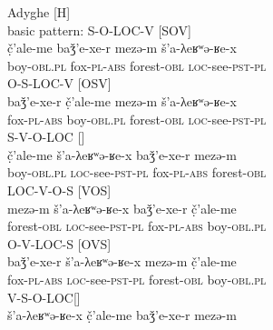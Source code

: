 \documentclass[output=paper,colorlinks,citecolor=brown, draft]{langscibook}
\begin{document}
\ea
\ea\label{Adyghe:ex:6}
Adyghe \citep[91]{jakovlev1941grammatika} [H] \\
basic pattern: \textcolor{C1}{S}-\textcolor{C2}{O}-\textcolor{C3}{LOC}-\textcolor{C4}{V} [SOV] \\
\gll \textcolor{C1}{č̣'ale-me} \textcolor{C2}{baǯ'e-xe-r} \textcolor{C3}{mezə-m} \textcolor{C4}{š'a-λeʁʷə-ʁe-x} \\ 
boy\textsc{-obl.pl} fox\textsc{-pl}\textsc{-abs} forest\textsc{-obl} \textsc{loc-}see\textsc{-pst}\textsc{-pl} \\
\ex\label{Adyghe:ex:7}
\textcolor{C2}{O}-\textcolor{C1}{S}-\textcolor{C3}{\textcolor{C3}{LOC}}-\textcolor{C4}{\textcolor{C4}{V}} [OSV] \\
\gll \textcolor{C2}{baǯ'e-xe-r} \textcolor{C1}{č̣'ale-me} \textcolor{C3}{mezə-m} \textcolor{C4}{š'a-λeʁʷə-ʁe-x} \\
fox\textsc{-pl-abs} boy\textsc{-obl.pl} forest\textsc{-obl} \textsc{loc-}see\textsc{-pst}\textsc{-pl} \\
\ex\label{Adyghe:ex:8}
\textcolor{C1}{S}-\textcolor{C4}{V}-\textcolor{C2}{O}-\textcolor{C3}{LOC} [] \\
\gll \textcolor{C1}{č̣'ale-me} \textcolor{C4}{š'a-λeʁʷə-ʁe-x} \textcolor{C2}{baǯ'e-xe-r} \textcolor{C3}{mezə-m} \\
boy\textsc{-obl.pl} \textsc{loc-}see\textsc{-pst}\textsc{-pl} fox\textsc{-pl}\textsc{-abs}  forest\textsc{-obl}\\
\ex\label{Adyghe:ex:9}
\textcolor{C3}{LOC}-\textcolor{C4}{V}-\textcolor{C2}{O}-\textcolor{C1}{S} [VOS] \\
\gll \textcolor{C3}{mezə-m} \textcolor{C4}{š'a-λeʁʷə-ʁe-x} \textcolor{C2}{baǯ'e-xe-r} \textcolor{C1}{č̣'ale-me} \\
forest\textsc{-obl} \textsc{loc-}see\textsc{-pst}\textsc{-pl} fox\textsc{-pl}\textsc{-abs} boy\textsc{-obl.pl} \\
\ex\label{Adyghe:ex:10}
\textcolor{C2}{O}-\textcolor{C4}{V}-\textcolor{C3}{LOC}-\textcolor{C1}{S} [OVS] \\
\gll \textcolor{C2}{baǯ'e-xe-r} \textcolor{C4}{š'a-λeʁʷə-ʁe-x} \textcolor{C3}{mezə-m} \textcolor{C1}{č̣'ale-me} \\
fox\textsc{-pl-abs} \textsc{loc-}see\textsc{-pst}\textsc{-pl} forest\textsc{-obl} boy\textsc{-obl.pl} \\
\ex\label{Adyghe:ex:11a}
\textcolor{C4}{V}-\textcolor{C1}{S}-\textcolor{C2}{O}-\textcolor{C3}{LOC}[] \\
\gll \textcolor{C4}{š'a-λeʁʷə-ʁe-x} \textcolor{C1}{č̣'ale-me} \textcolor{C2}{baǯ'e-xe-r} \textcolor{C3}{mezə-m} \\ 
\end{document}
